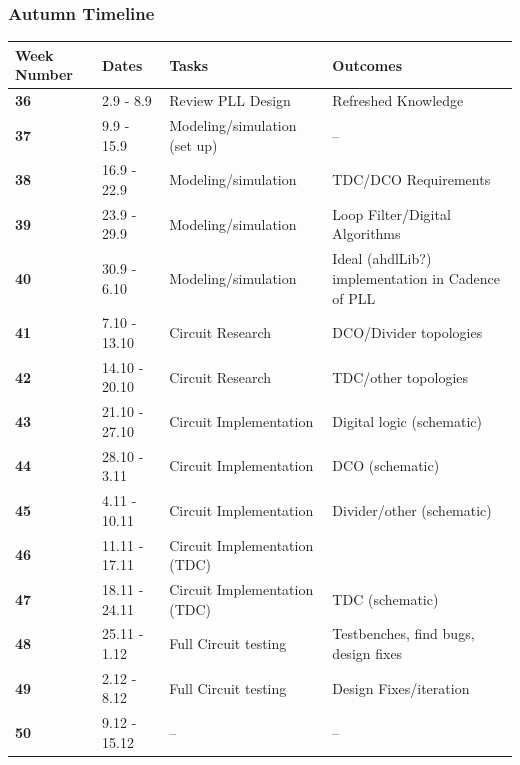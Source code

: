 \documentclass[t, screen, aspectratio=43]{beamer}
\begin{document}
\begin{frame}
	\frametitle{Autumn Timeline}
	\begin{table}[htb!]
		\tiny
		\centering
		\def\arraystretch{1.5}		
		\setlength\arrayrulewidth{0.75pt}
		\setlength{\tabcolsep}{1em} %
		\begin{tabular}{|l|l|l|l|}
			\hline 
			\rule[-1ex]{0pt}{2.5ex} \cellcolor{gray!40}\textbf{Week Number} & \cellcolor{gray!40}\textbf{Dates} &\cellcolor{gray!40}\textbf{Tasks} & \cellcolor{gray!40}\textbf{Outcomes}\\ 
			\hline 
			\rule[-1ex]{0pt}{2.5ex} \textbf{36}& 2.9 - 8.9 & Review PLL Design & Refreshed Knowledge\\ 
			\hline 
			\rule[-1ex]{0pt}{2.5ex} \textbf{37}& 9.9 - 15.9 & Modeling/simulation (set up) & --\\ 
			\hline 
			\rule[-1ex]{0pt}{2.5ex} \textbf{38}& 16.9 - 22.9 & Modeling/simulation & TDC/DCO Requirements\\ 
			\hline 
			\rule[-1ex]{0pt}{2.5ex} \textbf{39}& 23.9 - 29.9& Modeling/simulation& Loop Filter/Digital Algorithms\\ 
			\hline 
			\rule[-1ex]{0pt}{2.5ex} \textbf{40}& 30.9 - 6.10& Modeling/simulation& Ideal (ahdlLib?) implementation in Cadence of PLL\\ 
			\hline 
			\rule[-1ex]{0pt}{2.5ex} \textbf{41}& 7.10 - 13.10& Circuit Research & DCO/Divider topologies\\ 
			\hline 
			\rule[-1ex]{0pt}{2.5ex} \textbf{42}& 14.10 - 20.10& Circuit Research & TDC/other topologies\\ 
			\hline 
			\rule[-1ex]{0pt}{2.5ex} \textbf{43}& 21.10 - 27.10& Circuit Implementation& Digital logic (schematic)\\ 
			\hline 
			\rule[-1ex]{0pt}{2.5ex} \textbf{44}& 28.10 - 3.11& Circuit Implementation& DCO (schematic)\\ 
			\hline 
			\rule[-1ex]{0pt}{2.5ex} \textbf{45}& 4.11 - 10.11& Circuit Implementation& Divider/other (schematic)\\ 
			\hline 
			\rule[-1ex]{0pt}{2.5ex} \textbf{46}& 11.11 - 17.11& Circuit Implementation (TDC)& \\ 
			\hline 
			\rule[-1ex]{0pt}{2.5ex} \textbf{47}& 18.11 - 24.11& Circuit Implementation (TDC)& TDC (schematic)\\ 
			\hline 
			\rule[-1ex]{0pt}{2.5ex} \textbf{48}& 25.11 - 1.12& Full Circuit testing & Testbenches, find bugs, design fixes\\ 
			\hline 
			\rule[-1ex]{0pt}{2.5ex} \textbf{49}& 2.12 - 8.12& Full Circuit testing& Design Fixes/iteration\\ 
			\hline 
			\rule[-1ex]{0pt}{2.5ex} \textbf{50}& 9.12 - 15.12& --& --\\ 
			\hline 
		\end{tabular} 
	\end{table}   
\end{frame}
\end{document}
